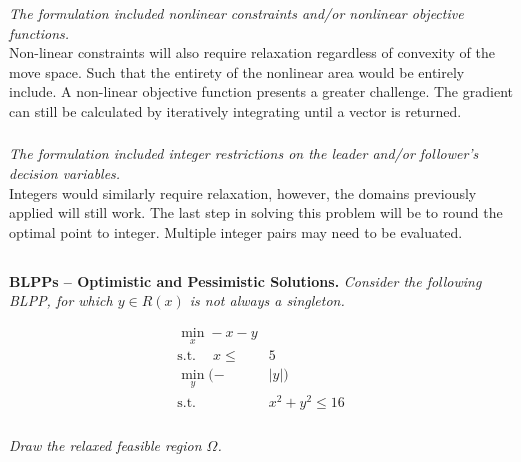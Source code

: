 \documentclass[12pt]{amsart}
\begin{document}
% 
% 

\subsubsection{}
\textit{The formulation included nonlinear constraints and/or nonlinear objective functions.} \\

Non-linear constraints will also require relaxation regardless of convexity of the move space.
Such that the entirety of the nonlinear area would be entirely include. 
A non-linear objective function presents a greater challenge. 
The gradient can still be calculated by iteratively integrating until a vector is returned.

\subsubsection{}
\textit{The formulation included integer restrictions on the leader and/or follower’s decision variables.} \\

Integers would similarly require relaxation, however, the domains previously applied will still work.
The last step in solving this problem will be to round the optimal point to integer.
Multiple integer pairs may need to be evaluated.

\subsection{}
\textbf{BLPPs – Optimistic and Pessimistic Solutions.} 
\textit{Consider the following BLPP, for which $y\in R(x)$ is not always a singleton.}

\begin{align*}
	\min_x	-x-y & \\
	\text{s.t.}\quad\	x \leq& 5 \\
	\min_y (-&|y|) \\
	\text{s.t.}\quad &	x^2 + y^2 \leq 16
\end{align*}

% 
% 

\subsubsection{}
\textit{Draw the relaxed feasible region $\Omega$.}
\end{document}
